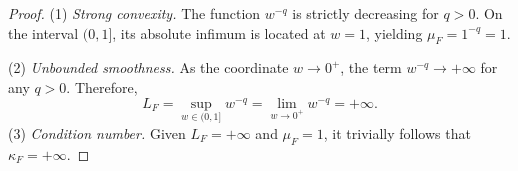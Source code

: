 \documentclass[10pt,a4paper]{amsart}
\begin{document}
\begin{proof}
(1) \textit{Strong convexity.} The function $w^{-q}$ is strictly decreasing for $q>0$. On the interval $(0,1]$, its absolute infimum is located at $w=1$, yielding $\mu_F = 1^{-q} = 1$.

(2) \textit{Unbounded smoothness.} As the coordinate $w\to 0^+$, the term $w^{-q}\to +\infty$ for any $q>0$. Therefore,
\[
L_F = \sup_{w \in(0,1]} w^{-q} = \lim_{w \to 0^+} w^{-q} = +\infty.
\]
(3) \textit{Condition number.} Given $L_F=+\infty$ and $\mu_F=1$, it trivially follows that $\kappa_F = +\infty$.
\end{proof}
\end{document}
